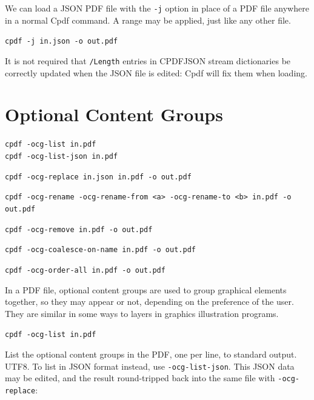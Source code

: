 \documentclass{book}
\begin{document}
We can load a JSON PDF file with the \texttt{-j} option in place of a PDF file anywhere in a normal Cpdf command. A range may be applied, just like any other file. 

  \begin{framed}
  \small\noindent\verb!cpdf -j in.json -o out.pdf!
  \end{framed}

\noindent It is not required that \texttt{/Length} entries in CPDFJSON stream dictionaries be correctly updated when the JSON file is edited: Cpdf will fix them when loading.

\clearpage\pagestyle{empty}
\chapter{Optional Content Groups}\label{chap:16}\pagestyle{fancy}

  {\small\begin{framed}
  \noindent\verb!cpdf -ocg-list in.pdf!\\
  \noindent\verb!cpdf -ocg-list-json in.pdf!

  \vspace{1.5mm}
  \noindent\verb!cpdf -ocg-replace in.json in.pdf -o out.pdf!

  \vspace{1.5mm}
  \noindent\verb!cpdf -ocg-rename -ocg-rename-from <a> -ocg-rename-to <b> in.pdf -o out.pdf!

  \vspace{1.5mm}
  \noindent\verb!cpdf -ocg-remove in.pdf -o out.pdf!

  \vspace{1.5mm}
  \noindent\verb!cpdf -ocg-coalesce-on-name in.pdf -o out.pdf!

  \vspace{1.5mm}
  \noindent\verb!cpdf -ocg-order-all in.pdf -o out.pdf!

  \end{framed}}


In a PDF file, optional content groups are used to group graphical elements together, so they may appear or not, depending on the preference of the user. They are similar in some ways to layers in graphics illustration programs.

  {\small\begin{framed}
  \noindent\verb!cpdf -ocg-list in.pdf!
  \end{framed}}

\noindent List the optional content groups in the PDF, one per line, to standard output. UTF8. To list in JSON format instead, use \texttt{-ocg-list-json}. This JSON data may be edited, and the result round-tripped back into the same file with \texttt{-ocg-replace}:
\end{document}
